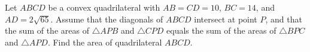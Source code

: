 Let $ABCD$ be a convex quadrilateral with $AB=CD=10$, $BC=14$, and $AD=2\sqrt{65}$.  Assume that the diagonals of $ABCD$ intersect at point $P$, and that the sum of the areas of $\triangle APB$ and $\triangle CPD$ equals the sum of the areas of $\triangle BPC$ and $\triangle APD$.  Find the area of quadrilateral $ABCD$.